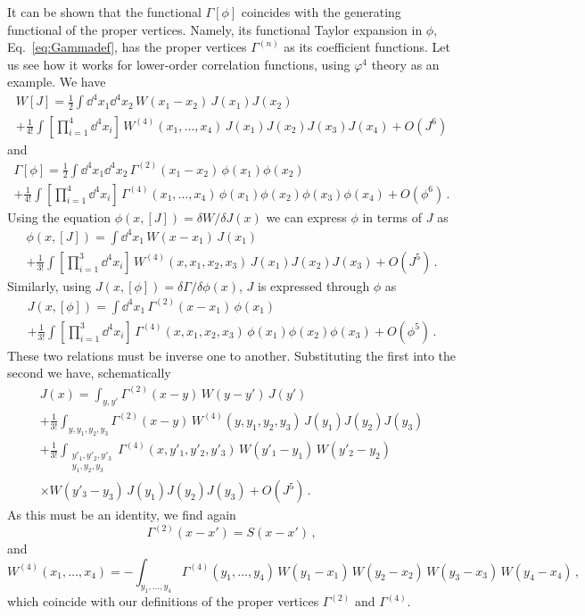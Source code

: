 It can be shown that the functional $\Gamma[\phi]$ coincides with the
generating functional of the proper vertices. Namely, its functional Taylor
expansion in $\phi$, Eq.~\eqref{eq:Gammadef}, has the proper vertices
$\Gamma^{(n)}$ as its coefficient functions. Let us see how it works for
lower-order correlation functions, using $\varphi^4$ theory as an example. We
have
\begin{multline*}
W[J]=\frac12\int \dd^4x_1\dd^4x_2\,W(x_1-x_2)\,J(x_1)J(x_2)\\
+\frac1{4!}\int\left[\prod_{i=1}^4\dd^4x_i\right]\,W^{(4)}(x_1,\dots,x_4)\,J(x_1)J(x_2)J(x_3)J(x_4)+O(J^6)
\end{multline*}
and
\begin{multline*}
\Gamma[\phi]=\frac12\int \dd^4x_1\dd^4x_2\,\Gamma^{(2)}(x_1-x_2)\,\phi(x_1)\phi(x_2)\\
+\frac1{4!}\int\left[\prod_{i=1}^4\dd^4x_i\right]\,\Gamma^{(4)}(x_1,\dots,x_4)\,\phi(x_1)\phi(x_2)\phi(x_3)\phi(x_4)+O(\phi^6)\,.
\end{multline*}
Using the equation $\phi(x,[J])=\delta W/\delta J(x)$ we can express $\phi$ in
terms of $J$ as
\begin{multline*}
\phi(x,[J])=\int \dd^4x_1\,W(x-x_1)\,J(x_1)\\
+\frac1{3!}\int\left[\prod_{i=1}^3\dd^4x_i\right]\,W^{(4)}(x,x_1,x_2,x_3)\,J(x_1)J(x_2)J(x_3)+O(J^5)\,.
\end{multline*}
Similarly, using $J(x,[\phi])=\delta\Gamma/\delta\phi(x)$, $J$ is expressed
through $\phi$ as
\begin{multline*}
J(x,[\phi])=\int \dd^4x_1\,\Gamma^{(2)}(x-x_1)\,\phi(x_1)\\
+\frac1{3!}\int\left[\prod_{i=1}^3\dd^4x_i\right]\,\Gamma^{(4)}(x,x_1,x_2,x_3)\,\phi(x_1)\phi(x_2)\phi(x_3)+O(\phi^5)\,.
\end{multline*}
These two relations must be inverse one to another. Substituting the first into
the second we have, schematically
\begin{multline*}
J(x)=\int_{y,y'}\Gamma^{(2)}(x-y)\,W(y-y')\,J(y')\\
+\frac1{3!}\int_{y,y_1,y_2,y_3}\Gamma^{(2)}(x-y)\,W^{(4)}(y,y_1,y_2,y_3)\,J(y_1)J(y_2)J(y_3)\\
+\frac1{3!}\int_{\substack{y'_1,y'_2,y'_3\\y_1,y_2,y_3}}\Gamma^{(4)}(x,y'_1,y'_2,y'_3)\,W(y'_1-y_1)\,W(y'_2-y_2)\\
\times W(y'_3-y_3)\,J(y_1)J(y_2)J(y_3)+O(J^5)\,.
\end{multline*}
As this must be an identity, we find again
\[
\Gamma^{(2)}(x-x')=S(x-x')\,,
\]
and
\[
W^{(4)}(x_1,\dots,x_4)=-\int_{y_1,\dots,y_4}\Gamma^{(4)}(y_1,\dots,y_4)\,W(y_1-x_1)\,W(y_2-x_2)\,W(y_3-x_3)\,W(y_4-x_4)\,,
\]
which coincide with our definitions of the proper vertices $\Gamma^{(2)}$ and
$\Gamma^{(4)}$.


